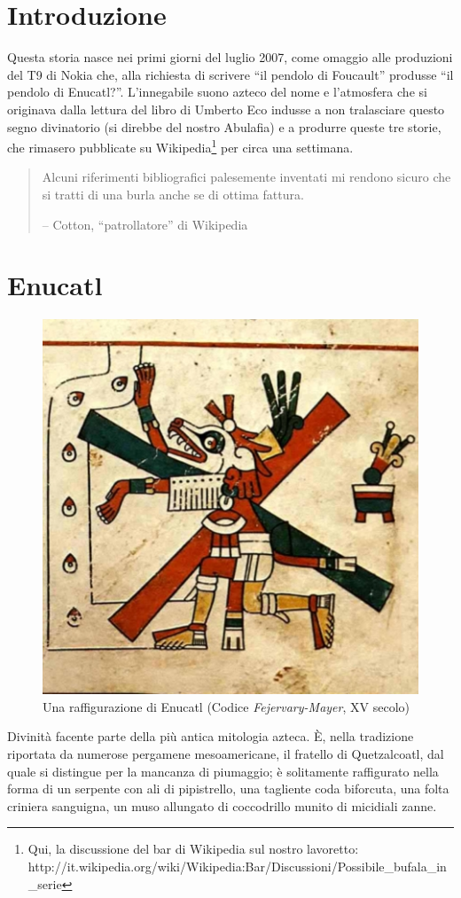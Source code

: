 \documentclass[italian,a4paper]{article}
\begin{document}
\section*{Introduzione}
Questa storia nasce nei primi giorni del luglio 2007, come omaggio alle
produzioni del T9 di Nokia che, alla richiesta di scrivere ``il pendolo di
Foucault'' produsse ``il pendolo di Enucatl?''. L'innegabile suono
azteco del nome e l'atmosfera che si originava
dalla lettura del libro di Umberto Eco indusse a non tralasciare questo
segno divinatorio (si direbbe del nostro Abulafia) e a produrre queste tre
storie, che rimasero pubblicate su Wikipedia\footnote{Qui, la discussione
del bar di Wikipedia sul nostro lavoretto:  \\
http://it.wikipedia.org/wiki/Wikipedia:Bar/Discussioni/Possibile\_bufala\_in\_serie} per circa una settimana.
\begin{quote}
    Alcuni riferimenti bibliografici palesemente inventati mi rendono sicuro
    che si tratti di una burla anche se di ottima fattura. \\
    \begin{flushright}
    -- Cotton, ``patrollatore'' di Wikipedia
    \end{flushright}
\end{quote}
 

\section*{Enucatl}
\begin{figure}
    \includegraphics{enucatl.eps}
    \caption{Una raffigurazione di Enucatl (Codice \emph{Fejervary-Mayer}, XV
    secolo)}
\end{figure}
 Divinità facente parte della più antica mitologia azteca. \`E,
 nella tradizione riportata da numerose pergamene mesoamericane, il fratello
 di Quetzalcoatl, dal quale si distingue per la mancanza di piumaggio; è
 solitamente raffigurato nella forma di un serpente con ali di pipistrello,
 una tagliente coda biforcuta, una folta criniera sanguigna, un muso
 allungato di coccodrillo munito di micidiali zanne.
\end{document}
